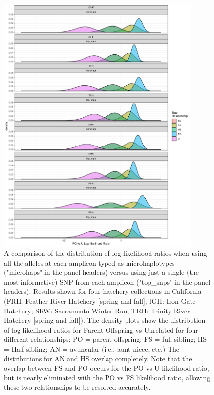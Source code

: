 \begin{figure}
\begin{center}
\includegraphics[width=0.9\textwidth]{images/ckmr-comp-figure-crop.pdf}
\end{center}
\caption[Comparison of microhaplotypes vs.~best SNP in each amplicon]{\footnotesize 
A comparison of the distribution of log-likelihood ratios when using all the alleles at each
amplicon typed as microhaplotypes ("microhaps" in the panel headers) versus using just a single (the most informative) SNP from each
amplicon ("top\_snps" in the panel headers).  Results shown for four hatchery collections in California 
(FRH: Feather River Hatchery [spring and fall]; IGH: Iron Gate Hatchery; SRW: Sacramento Winter Run;
TRH: Trinity River Hatchery [spring and fall]).  The density plots show
the distribution of log-likelihood ratios for Parent-Offspring vs Unrelated for four different relationships:
PO = parent offspring; FS = full-sibling; HS = Half sibling; AN = avuncular (i.e., aunt-niece, etc.)
The distributions for AN and HS overlap completely.  Note that the overlap between FS and PO occurs
for the PO vs U likelihood ratio, but is nearly eliminated with the PO vs FS likelihood ratio, allowing these
two relationships to be resolved accurately.}
\label{fig:ckmr-comp}
\end{figure}




